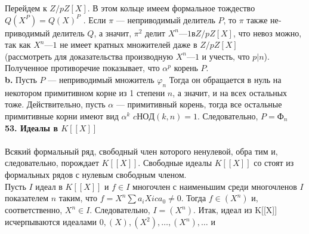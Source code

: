 \documentclass{mai_book}
\begin{document}
Перейдем к $Z/pZ[X]$. В этом кольце имеем формальное тождество\linebreak
$Q(X^{P}) = Q(X)^{P}$ . Если $\pi$ --- неприводимый делитель $P$, то $\pi$ также не­\linebreak
приводимый делитель $Q$, а значит, $\pi^{2}$ делит $X^{n} — 1 в Z/pZ[X]$, что невоз­\linebreak
можно, так как $X^{n} — 1$ не имеет кратных множителей даже в $Z/pZ[X]$\\
\newpage
\noindent (рассмотреть для доказательства производную $X^{n} — 1$ и учесть, \linebreak
что $p|n$). Полученное противоречие показывает, что $\alpha^{p}$ корень $P$.\\
\hspace*{15pt}\textbf{b.} Пусть $P$ — неприводимый множитель $\varphi_n$ Тогда он обращается\linebreak
в нуль на некотором примитивном корне из 1 степени $n$, а значит, и на\linebreak
всех остальных тоже. Действительно, пусть $\alpha$ — примитивный корень,\linebreak
тогда все остальные примитивные корни имеют вид $\alpha^{k}$ $c НОД(k, n) = 1$.\linebreak
Следовательно, $P = \text{Ф}_n$\newline
\\
\noindent\textbf{53. Идеалы в $K[[X]]$}\\
\\
\hspace*{15pt}Всякий формальный ряд, свободный член которого ненулевой, обра­\linebreak
тим и, следовательно, порождает $K[[X]]$. Свободные идеалы $K[[X]]$ со­\linebreak
стоят из формальных рядов с нулевым свободным членом.\\
\hspace*{0pt} Пусть $I$ идеал в $K[[X]]$ и $f \in I$ многочлен с наименьшим среди\linebreak
многочленов $I$ показателем $n$ таким, что $f = X^{n}\sum a_{i}X{i} c a_0 \neq 0$. Тогда\linebreak
$f \in (X^{n})$ и, соответственно, $X^{n} \in I$. Следовательно, $I = (X^{n}).$ Итак,\linebreak
идеал из K[[X]] исчерпываются идеалами ${0}, (X), (X^{2}),\ldots, (X^{n} ), \ldots$ и\linebreak
\end{document}
